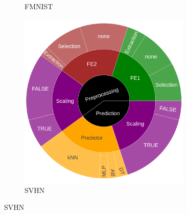 \begin{figure}
\begin{subfigure}[t]{0.3\textwidth}
    \caption{FMNIST}
  	\end{subfigure}
	\begin{subfigure}[t]{0.3\textwidth}
    \centering\includegraphics[width=0.9\textwidth]{img/sunburst/svhn.png}
    \caption{SVHN}
  	\end{subfigure}


\end{figure}
